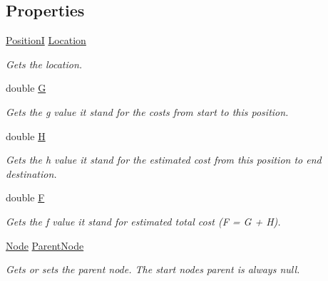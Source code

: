 \subsection*{Properties}
\begin{DoxyCompactItemize}
\item 
\hyperlink{classCore_1_1Models_1_1PositionI}{Position\+I} \hyperlink{classCore_1_1Controllers_1_1AStar_1_1Node_a035f31738d38e887cef34e7d1a34ea39}{Location}
\begin{DoxyCompactList}\small\item\em Gets the location. \end{DoxyCompactList}\item 
double \hyperlink{classCore_1_1Controllers_1_1AStar_1_1Node_a53a25b3c833102975ae2d3526f58abcc}{G}
\begin{DoxyCompactList}\small\item\em Gets the g value it stand for the costs from start to this position. \end{DoxyCompactList}\item 
double \hyperlink{classCore_1_1Controllers_1_1AStar_1_1Node_affebd55aa7d7b5471b1157055f5c2a7a}{H}
\begin{DoxyCompactList}\small\item\em Gets the h value it stand for the estimated cost from this position to end destination. \end{DoxyCompactList}\item 
double \hyperlink{classCore_1_1Controllers_1_1AStar_1_1Node_a41c0c83fe6dc82b87b6654ed171351b9}{F}
\begin{DoxyCompactList}\small\item\em Gets the f value it stand for estimated total cost (F = G + H). \end{DoxyCompactList}\item 
\hyperlink{classCore_1_1Controllers_1_1AStar_1_1Node}{Node} \hyperlink{classCore_1_1Controllers_1_1AStar_1_1Node_a1965c3b218d991e0d791521cade9bec1}{Parent\+Node}
\begin{DoxyCompactList}\small\item\em Gets or sets the parent node. The start node\textquotesingle{}s parent is always null. \end{DoxyCompactList}\end{DoxyCompactItemize}


